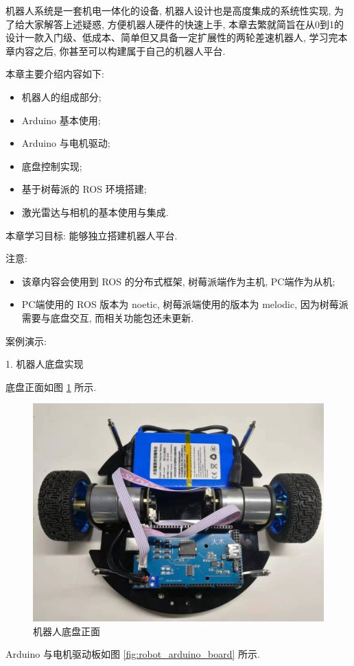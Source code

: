 \documentclass[openany, fontset=windowsold]{ctexbook}
\theoremstyle{kaiti}
\theoremstyle{normal}
\begin{document}
机器人系统是一套机电一体化的设备, 机器人设计也是高度集成的系统性实现, 为了给大家解答上述疑惑, 方便机器人硬件的快速上手, 本章去繁就简旨在从0到1的设计一款入门级、低成本、简单但又具备一定扩展性的两轮差速机器人, 学习完本章内容之后, 你甚至可以构建属于自己的机器人平台.

本章主要介绍内容如下:

\begin{itemize}
  \item 机器人的组成部分; 
  \item Arduino 基本使用; 
  \item Arduino 与电机驱动; 
  \item 底盘控制实现; 
  \item 基于树莓派的 ROS 环境搭建; 
  \item 激光雷达与相机的基本使用与集成.
\end{itemize}

本章学习目标: 能够独立搭建机器人平台.

注意:

\begin{itemize}
  \item 该章内容会使用到 ROS 的分布式框架, 树莓派端作为主机, PC端作为从机; 
  \item PC端使用的 ROS 版本为 noetic, 树莓派端使用的版本为 melodic, 因为树莓派需要与底盘交互, 而相关功能包还未更新.
\end{itemize}

案例演示:

1. 机器人底盘实现

底盘正面如图 \ref{fig:robot_chassis_front} 所示.

\begin{figure}[!ht]
  \centering
  \includegraphics[width=.5\textwidth]{robot_chassis_front.jpg}
  \caption{机器人底盘正面}
  \label{fig:robot_chassis_front}
\end{figure}

Arduino 与电机驱动板如图 \ref{fig:robot_arduino_board} 所示.
\end{document}
